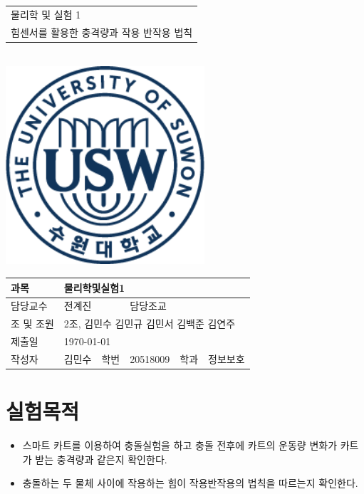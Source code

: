 \documentclass[12pt,a4paper]{article}
\begin{document}
\begin{titlepage}
    \centering
    \begin{tabular}{|C{15cm}|}
        \hline
        \rule{0in}{6ex}
        {\huge 물리학 및 실험 1\par} \\ 
        {\large 힘센서를 활용한 충격량과 작용 반작용 법칙\par} \\
        \hline
    \end{tabular} \\
    \vspace{5cm}
    \includegraphics[height=7.36cm]{logo.png}\par
    \vspace{3cm}
    \begin{tabular}{|l|l|l|l|l|l|}
        \hline
        과목 & \multicolumn{5}{l|}{물리학및실험1} \\
        \hline
        담당교수 & \multicolumn{2}{l|}{전계진} & 담당조교 & \multicolumn{2}{l|}{} \\
        \hline
        조 및 조원 & \multicolumn{5}{l|}{2조, 김민수 김민규 김민서 김백준 김연주} \\
        \hline
        제출일 & \multicolumn{5}{l|}{\today} \\
        \hline
        작성자 & 김민수 & 학번 & 20518009 & 학과 & 정보보호 \\
        \hline
    \end{tabular}
\end{titlepage}
\section{실험목적}
\begin{itemize}
    \item 스마트 카트를 이용하여 충돌실험을 하고 충돌 전후에 카트의 운동량 변화가
        카트가 받는 충격량과 같은지 확인한다.
    \item 충돌하는 두 물체 사이에 작용하는 힘이 작용반작용의 법칙을 따르는지
        확인한다.
\end{itemize}
\end{document}
